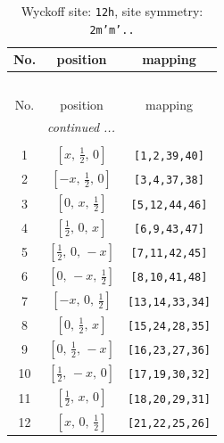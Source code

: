 \documentclass[fleqn,8pt]{jsarticle}
\begin{document}
\begin{longtable}{ccc}
\caption{Wyckoff site: {\tt 12h}, site symmetry: {\tt 2m'm'..}}
 \\
 \hline \hline
No. & position & mapping \\ \hline \endfirsthead

\multicolumn{2}{l}{\tablename\ \thetable{}} \\
 \hline \hline
No. & position & mapping \\ \hline \endhead

 \hline \hline
\multicolumn{2}{r}{\footnotesize\it continued ...} \\ \endfoot

 \hline \hline
\multicolumn{2}{r}{} \\ \endlastfoot

1 & $\left[ x,\, \frac{1}{2},\, 0 \right]$ & {\tt [1,2,39,40]} \\ \hline
2 & $\left[ - x,\, \frac{1}{2},\, 0 \right]$ & {\tt [3,4,37,38]} \\ \hline
3 & $\left[ 0,\, x,\, \frac{1}{2} \right]$ & {\tt [5,12,44,46]} \\ \hline
4 & $\left[ \frac{1}{2},\, 0,\, x \right]$ & {\tt [6,9,43,47]} \\ \hline
5 & $\left[ \frac{1}{2},\, 0,\, - x \right]$ & {\tt [7,11,42,45]} \\ \hline
6 & $\left[ 0,\, - x,\, \frac{1}{2} \right]$ & {\tt [8,10,41,48]} \\ \hline
7 & $\left[ - x,\, 0,\, \frac{1}{2} \right]$ & {\tt [13,14,33,34]} \\ \hline
8 & $\left[ 0,\, \frac{1}{2},\, x \right]$ & {\tt [15,24,28,35]} \\ \hline
9 & $\left[ 0,\, \frac{1}{2},\, - x \right]$ & {\tt [16,23,27,36]} \\ \hline
10 & $\left[ \frac{1}{2},\, - x,\, 0 \right]$ & {\tt [17,19,30,32]} \\ \hline
11 & $\left[ \frac{1}{2},\, x,\, 0 \right]$ & {\tt [18,20,29,31]} \\ \hline
12 & $\left[ x,\, 0,\, \frac{1}{2} \right]$ & {\tt [21,22,25,26]} \\
\end{longtable}
\renewcommand{\arraystretch}{1.2}
\end{document}
